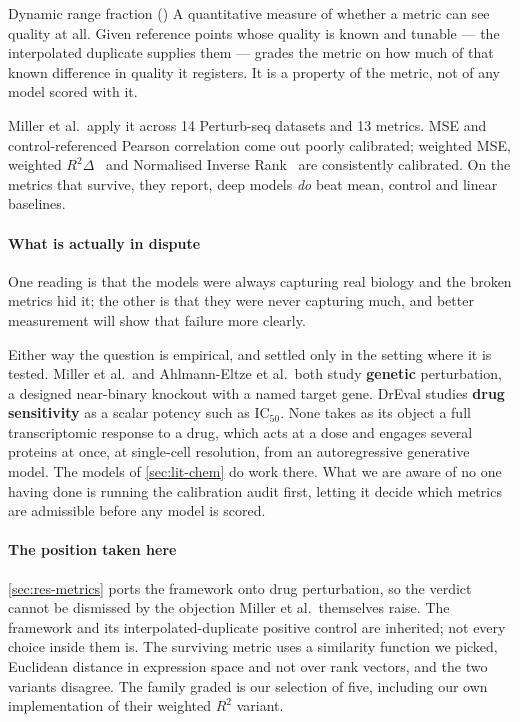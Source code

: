 \begin{defn}{Dynamic range fraction (\DRF)}
A quantitative measure of whether a metric can see quality at all. Given
reference points whose quality is known and tunable --- the interpolated
duplicate supplies them --- \DRF{} grades the metric on how much of that known
difference in quality it registers. It is a property of the metric, not of any
model scored with it.
\end{defn}

Miller et al.\ apply it across 14 Perturb-seq datasets and 13 metrics. MSE and
control-referenced Pearson correlation come out poorly calibrated; weighted MSE,
weighted $R^2\Delta$~\cite{mejia} and Normalised Inverse
Rank~\cite{perturbench} are consistently calibrated. On the metrics that survive,
they report, deep models \emph{do} beat mean, control and linear baselines.

\paragraph{What is actually in dispute} One reading is that the models were
always capturing real biology and the broken metrics hid it; the other is that
they were never capturing much, and better measurement will show that failure
more clearly.

Either way the question is empirical, and settled only in the setting where it is
tested. Miller et al.\ and Ahlmann-Eltze et al.\ both study \textbf{genetic}
perturbation, a designed near-binary knockout with a named target gene. DrEval
studies \textbf{drug sensitivity} as a scalar potency such as IC$_{50}$. None
takes as its object a full transcriptomic response to a drug, which acts at a
dose and engages several proteins at once, at single-cell resolution, from an
autoregressive generative model. The models of \cref{sec:lit-chem} do work
there. What we are aware of no one having done is running the calibration audit
first, letting it decide which metrics are admissible before any model is
scored.

\paragraph{The position taken here}
\cref{sec:res-metrics} ports the \DRF{} framework onto drug perturbation, so the
verdict cannot be dismissed by the objection Miller et al.\ themselves raise. The
framework and its interpolated-duplicate positive control are inherited; not
every choice inside them is. The surviving metric uses a similarity function we
picked, Euclidean distance in expression space and not over rank vectors, and the
two variants disagree. The family graded is our selection of five, including our
own implementation of their weighted $R^2$ variant.

